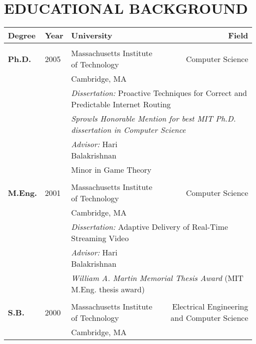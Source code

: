 \cfoot{\fancyplain{\footernoteA}{\footernoteB}}

\maketitle
\newpage

\vfill
\begin{small}
\tableofcontents
\end{small}
\vfill
\newpage

\setlength{\parskip}{1pt}
\section*{EDUCATIONAL BACKGROUND}
\label{sec:educational}
\begin{center}
\begin{tabular}{p{.5in}lp{2.5in}r}

{\bf Degree} & {\bf Year} & {\bf University} & {\bf Field} \\
\hline \\[\tabitemskip]
{\bf Ph.D.} & 2005 & Massachusetts Institute of Technology & Computer Science
\\
& & Cambridge, MA \\

&& \multicolumn{2}{l}{{\it Dissertation:} Proactive Techniques for
Correct and Predictable Internet Routing}\\ 
&& \multicolumn{2}{l}{{\em Sprowls Honorable Mention for best MIT
Ph.D. dissertation in Computer Science}} \\
&& {\it Advisor:}  Hari Balakrishnan \\
&& Minor in Game Theory \\
\\


{\bf M.Eng.} & 2001 & Massachusetts Institute of Technology & Computer Science
\\
& & Cambridge, MA \\
&& \multicolumn{2}{l}{{\it Dissertation:} Adaptive Delivery of Real-Time
Streaming Video}\\ 
&& {\it Advisor:}  Hari Balakrishnan \\
&& \multicolumn{2}{l}{{\em William A. Martin Memorial Thesis Award} (MIT
M.Eng. thesis award)} \\
\\


{\bf S.B.} & 2000 & Massachusetts Institute of Technology & Electrical
Engineering and Computer Science \\
& & Cambridge, MA \\
\end{tabular}
\end{center}

